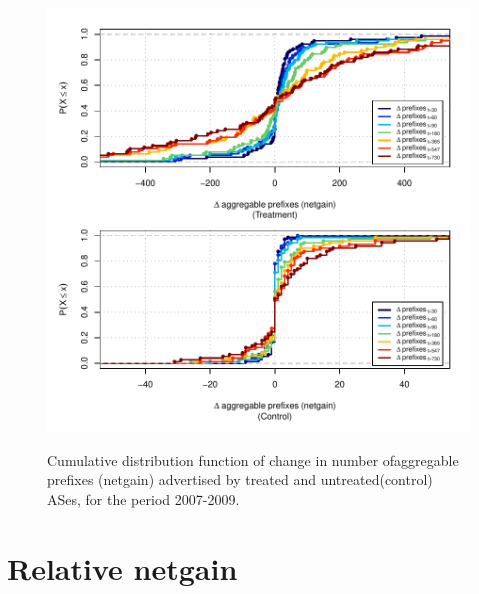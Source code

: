 \clearpage
\vspace*{16pt}
\begin{figure}[H]
\begin{centering}
\begin{singlespace}
\captionsetup{list=no}
    \includegraphics[width=6in]{figures/behavior-netgain-2007_2009-corr.pdf}
    \vspace{-2em}\\
    \caption{Cumulative distribution function of change in number ofaggregable
    prefixes (netgain) advertised by treated and untreated(control) ASes, for
    the period 2007-2009.}
\end{singlespace}
\end{centering}
\end{figure}


\clearpage
\section{Relative netgain}


